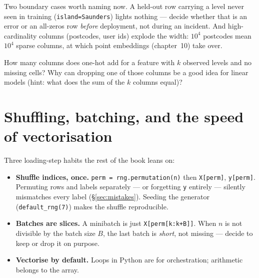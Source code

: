 Two boundary cases worth naming now. A held-out row carrying a level never
seen in training (\texttt{island=Saunders}) lights nothing --- decide whether
that is an error or an all-zeros row \emph{before} deployment, not during an
incident. And high-cardinality columns (postcodes, user ids) explode the width:
$10^4$ postcodes mean $10^4$ sparse columns, at which point embeddings
(chapter~10) take over.

\begin{checkpoint}
How many columns does one-hot add for a feature with $k$ observed levels and
no missing cells? Why can dropping one of those columns be a good idea for
linear models (hint: what does the sum of the $k$ columns equal)?
\end{checkpoint}

\section{Shuffling, batching, and the speed of vectorisation}\label{sec:vectorise}

Three loading-step habits the rest of the book leans on:

\begin{itemize}
\item \textbf{Shuffle indices, once.} \texttt{perm = rng.permutation(n)} then
  \texttt{X[perm]}, \texttt{y[perm]}. Permuting rows and labels separately ---
  or forgetting \texttt{y} entirely --- silently mismatches every label
  (\S\ref{sec:mistakes}). Seeding the generator (\texttt{default\_rng(7)})
  makes the shuffle reproducible.
\item \textbf{Batches are slices.} A minibatch is just
  \texttt{X[perm[k:k+B]]}. When $n$ is not divisible by the batch size $B$,
  the last batch is \emph{short}, not missing --- decide to keep or drop it on
  purpose.
\item \textbf{Vectorise by default.} Loops in Python are for orchestration;
  arithmetic belongs to the array.
\end{itemize}

